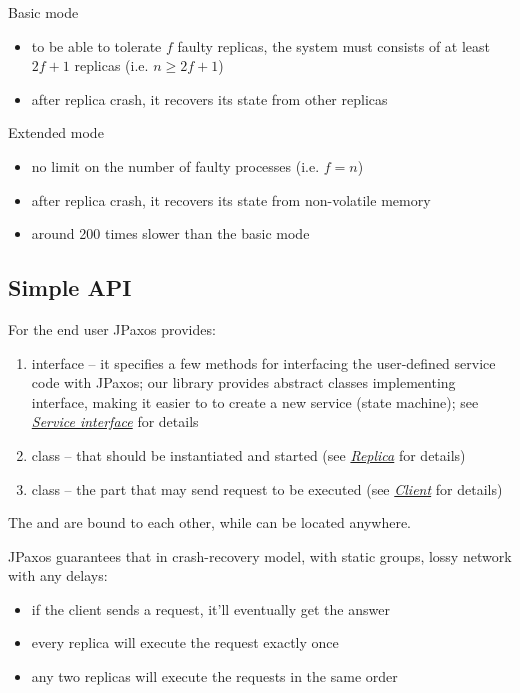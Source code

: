 Basic mode
\begin{itemize}
\item {} 
to be able to tolerate $f$ faulty replicas, the system must consists
of at least $2f + 1$ replicas (i.e. $n \ge 2f + 1$)

\item {} 
after replica crash, it recovers its state from other replicas

\end{itemize}

Extended mode
\begin{itemize}
\item {} 
no limit on the number of faulty processes (i.e. $f = n$)

\item {} 
after replica crash, it recovers its state from non-volatile memory

\item {} 
around 200 times slower than the basic mode

\end{itemize}


\subsection{Simple API}
\label{overview:simple-api}
For the end user JPaxos provides:
\begin{enumerate}
\item {} 
 interface -- it specifies a few methods for interfacing
the user-defined service code with JPaxos; our library provides
abstract classes implementing  interface, making it easier to
to create a new service (state machine);
see {\hyperref[api:jpaxos-service]{\emph{Service interface}}} for details

\item {} 
 class -- that should be instantiated and started
(see {\hyperref[api:jpaxos-replica]{\emph{Replica}}} for details)

\item {} 
 class -- the part that may send request to be executed
(see {\hyperref[api:jpaxos-client]{\emph{Client}}} for details)

\end{enumerate}

The  and  are bound to each other, while
 can be located anywhere.

JPaxos guarantees that in crash-recovery model, with static groups,
lossy network with any delays:
\begin{itemize}
\item {} 
if the client sends a request, it'll eventually get the answer

\item {} 
every replica will execute the request exactly once

\item {} 
any two replicas will execute the requests in the same order

\end{itemize}


